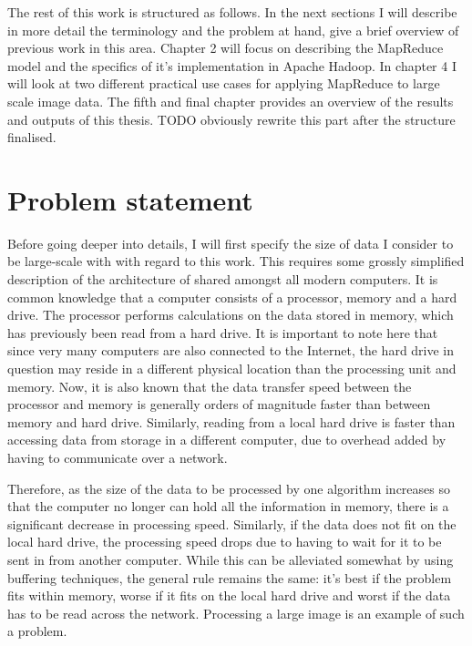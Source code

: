 \documentclass [12pt,a4paper]{report}
\begin{document}
The rest of this work is structured as follows. In the next sections I will describe in more detail the terminology and the problem at hand, give a brief overview of previous work in this area. Chapter 2 will focus on describing the MapReduce model and the specifics of it's implementation in Apache Hadoop. In chapter 4 I will look at two different practical use cases for applying MapReduce to large scale image data. The fifth and final chapter provides an overview of the results and outputs of this thesis. TODO obviously rewrite this part after the structure finalised. %


	

\section{Problem statement}

Before going deeper into details, I will first specify the size of data I consider to be large-scale with with regard to this work. This requires some grossly simplified description of the architecture of shared amongst all modern computers. It is common knowledge that a computer consists of a processor, memory and a hard drive. The processor performs calculations on the data stored in memory, which has previously been read from a hard drive. It is important to note here that since very many computers are also connected to the Internet, the hard drive in question may reside in a different physical location than the processing unit and memory. Now, it is also known that the data transfer speed between the processor and memory is generally orders of magnitude faster than between memory and hard drive. Similarly, reading from a local hard drive is faster than accessing data from storage in a different computer, due to overhead added by having to communicate over a network.

Therefore, as the size of the data to be processed by one algorithm increases so that the computer no longer can hold all the information in memory, there is a significant decrease in processing speed. Similarly, if the data does not fit on the local hard drive, the processing speed drops due to having to wait for it to be sent in from another computer. While this can be alleviated somewhat by using buffering techniques, the general rule remains the same: it's best if the problem fits within memory, worse if it fits on the local hard drive and worst if the data has to be read across the network. Processing a large image is an example of such a problem.
\end{document}
